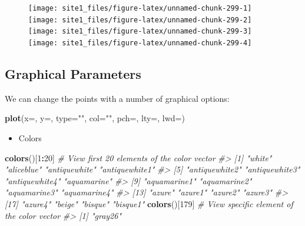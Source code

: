 \documentclass[]{book}
\newenvironment{Shaded}{\begin{snugshade}}{\end{snugshade}}
\newcommand{\KeywordTok}[1]{\textcolor[rgb]{0.13,0.29,0.53}{\textbf{#1}}}
\newcommand{\DataTypeTok}[1]{\textcolor[rgb]{0.13,0.29,0.53}{#1}}
\newcommand{\DecValTok}[1]{\textcolor[rgb]{0.00,0.00,0.81}{#1}}
\newcommand{\StringTok}[1]{\textcolor[rgb]{0.31,0.60,0.02}{#1}}
\newcommand{\CommentTok}[1]{\textcolor[rgb]{0.56,0.35,0.01}{\textit{#1}}}
\newcommand{\OperatorTok}[1]{\textcolor[rgb]{0.81,0.36,0.00}{\textbf{#1}}}
\newcommand{\NormalTok}[1]{#1}
\providecommand{\tightlist}{%
  \setlength{\itemsep}{0pt}\setlength{\parskip}{0pt}}
\begin{document}
\begin{figure}

{\centering \texttt{[image: site1\_files/figure-latex/unnamed-chunk-299-1]} \texttt{[image: site1\_files/figure-latex/unnamed-chunk-299-2]} \texttt{[image: site1\_files/figure-latex/unnamed-chunk-299-3]} \texttt{[image: site1\_files/figure-latex/unnamed-chunk-299-4]} 

}

\caption{ }\label{fig:unnamed-chunk-299}
\end{figure}

\subsection{Graphical Parameters}\label{graphical-parameters}

We can change the points with a number of graphical options:

\begin{Shaded}
\begin{Highlighting}[]
\KeywordTok{plot}\NormalTok{(}\DataTypeTok{x=}\NormalTok{, }\DataTypeTok{y=}\NormalTok{, }\DataTypeTok{type=}\StringTok{""}\NormalTok{, }\DataTypeTok{col=}\StringTok{""}\NormalTok{, }\DataTypeTok{pch=}\NormalTok{, }\DataTypeTok{lty=}\NormalTok{, }\DataTypeTok{lwd=}\NormalTok{)}
\end{Highlighting}
\end{Shaded}

\begin{itemize}
\tightlist
\item
  Colors
\end{itemize}

\begin{Shaded}
\begin{Highlighting}[]
\KeywordTok{colors}\NormalTok{()[}\DecValTok{1}\OperatorTok{:}\DecValTok{20}\NormalTok{] }\CommentTok{# View first 20 elements of the color vector}
\CommentTok{#>  [1] "white"         "aliceblue"     "antiquewhite"  "antiquewhite1"}
\CommentTok{#>  [5] "antiquewhite2" "antiquewhite3" "antiquewhite4" "aquamarine"   }
\CommentTok{#>  [9] "aquamarine1"   "aquamarine2"   "aquamarine3"   "aquamarine4"  }
\CommentTok{#> [13] "azure"         "azure1"        "azure2"        "azure3"       }
\CommentTok{#> [17] "azure4"        "beige"         "bisque"        "bisque1"}
\KeywordTok{colors}\NormalTok{()[}\DecValTok{179}\NormalTok{] }\CommentTok{# View specific element of the color vector}
\CommentTok{#> [1] "gray26"}
\end{Highlighting}
\end{Shaded}
\end{document}
